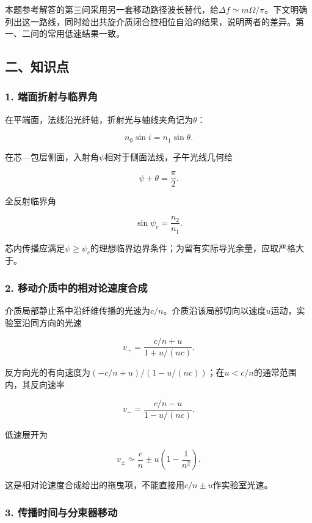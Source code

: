\documentclass[12pt,a4paper,fontset=fandol]{ctexart}
\begin{document}
本题参考解答的第三问采用另一套移动路径波长替代，给\(\Delta f\simeq m\Omega/\pi\)。下文明确列出这一路线，同时给出共旋介质闭合腔相位自洽的结果，说明两者的差异。第一、二问的常用低速结果一致。

\subsection{二、知识点}\label{ux4e8cux77e5ux8bc6ux70b9-5}

\subsubsection{1.
端面折射与临界角}\label{ux7aefux9762ux6298ux5c04ux4e0eux4e34ux754cux89d2}

在平端面，法线沿光纤轴，折射光与轴线夹角记为\(\theta\)：

\[
n_0\sin i=n_1\sin\theta.
\]

在芯---包层侧面，入射角\(\psi\)相对于侧面法线，子午光线几何给

\[
\psi+\theta=\frac\pi2.
\]

全反射临界角

\[
\sin\psi_c=\frac{n_2}{n_1}.
\]

芯内传播应满足\(\psi\geq\psi_c\)的理想临界边界条件；为留有实际导光余量，应取严格大于。

\subsubsection{2.
移动介质中的相对论速度合成}\label{ux79fbux52a8ux4ecbux8d28ux4e2dux7684ux76f8ux5bf9ux8bbaux901fux5ea6ux5408ux6210}

介质局部静止系中沿纤维传播的光速为\(c/n\)。介质沿该局部切向以速度\(u\)运动，实验室沿同方向的光速

\[
v_+=\frac{c/n+u}{1+u/(nc)}.
\]

反方向光的有向速度为\((-c/n+u)/(1-u/(nc))\)；在\(u<c/n\)的通常范围内，其反向速率

\[
v_-=\frac{c/n-u}{1-u/(nc)}.
\]

低速展开为

\[
v_\pm\simeq\frac cn
\pm u\left(1-\frac1{n^2}\right).
\]

这是相对论速度合成给出的拖曳项，不能直接用\(c/n\pm u\)作实验室光速。

\subsubsection{3.
传播时间与分束器移动}\label{ux4f20ux64adux65f6ux95f4ux4e0eux5206ux675fux5668ux79fbux52a8}
\end{document}
